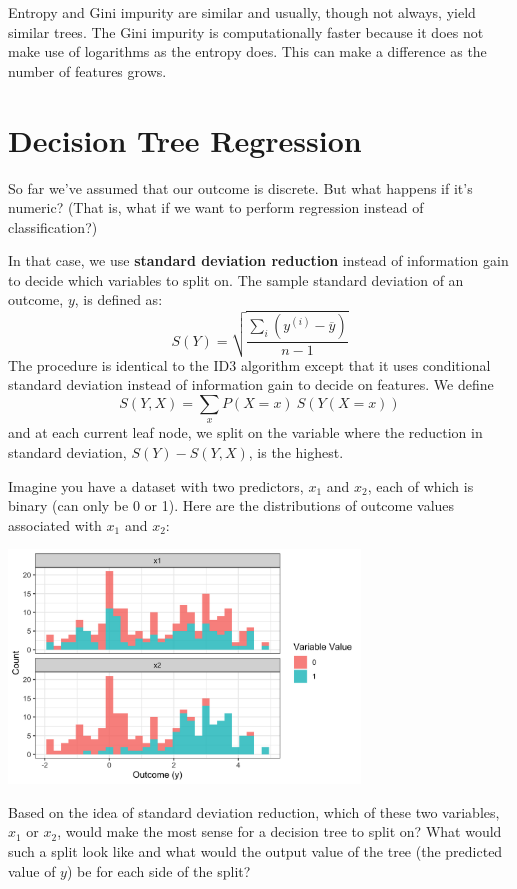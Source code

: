 Entropy and Gini impurity are similar and usually, though not always, yield similar trees. The Gini impurity is computationally faster because it does not make use of logarithms as the entropy does. This can make a difference as the number of features grows. 


\section{Decision Tree Regression}

So far we've assumed that our outcome is discrete. But what happens if it's numeric? (That is, what if we want to perform regression instead of classification?)

In that case, we use \textbf{standard deviation reduction} instead of information gain to decide which variables to split on. The sample standard deviation of an outcome, $y$, is defined as:
$$ S(Y) = \sqrt{\frac{\sum_i(y^{(i)} - \overline{y})}{n-1}} $$
The procedure is identical to the ID3 algorithm except that it uses conditional standard deviation instead of information gain to decide on features. We define
$$ S(Y, X) = \sum_{x} P(X = x)~ S(Y(X=x)) $$
and at each current leaf node, we split on the variable where the reduction in standard deviation, $S(Y) - S(Y,X)$, is the highest. 
\vspace{2mm}

\begin{question}{}
Imagine you have a dataset with two predictors, $x_1$ and $x_2$, each of which is binary (can only be 0 or 1). Here are the distributions of outcome values associated with $x_1$ and $x_2$:
\begin{center}
\includegraphics[width=0.7\textwidth]{img/esl-reg-decision-tree-varsplit.png}
\end{center}
Based on the idea of standard deviation reduction, which of these two variables, $x_1$ or $x_2$, would make the most sense for a decision tree to split on? What would such a split look like and what would the output value of the tree (the predicted value of $y$) be for each side of the split?
\end{question}

